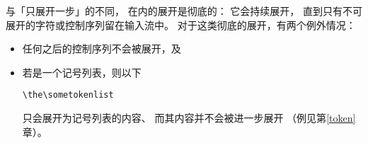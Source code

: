 \documentclass{book}
\begin{document}
与「只展开一步」的不同，
在内的展开是彻底的：
它会持续展开，
直到只有不可展开的字符或控制序列留在输入流中。
对于这类彻底的展开，有两个例外情况：
\begin{itemize} \item 任何之后的控制序列不会被展开，及
\item 若是一个记号列表，则以下
\begin{verbatim}
\the\sometokenlist 
\end{verbatim}
只会展开为记号列表的内容、
而其内容并不会被进一步展开
（例见第\ref{token}章）。
\end{itemize}
\end{document}
